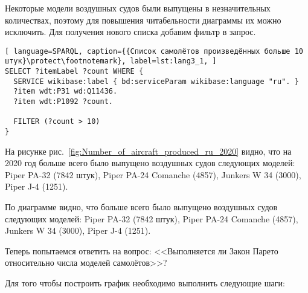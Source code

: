 Некоторые модели воздушных судов были выпущены в незначительных количествах, поэтому для повышения читабельности диаграммы их можно исключить. Для получения нового списка добавим фильтр в запрос.

\begin{lstlisting}[ language=SPARQL, caption={{Список самолётов произведённых больше 10 штук}\protect\footnotemark}, label=lst:lang3_1, ]
SELECT ?itemLabel ?count WHERE {
  SERVICE wikibase:label { bd:serviceParam wikibase:language "ru". }
  ?item wdt:P31 wd:Q11436.
  ?item wdt:P1092 ?count.
  
  FILTER (?count > 10)
}
\end{lstlisting}


На рисунке рис.~\ref{fig:Number_of_aircraft_produced_ru_2020} видно, что на 2020 год больше всего было выпущено воздушных судов следующих моделей: Piper PA-32 (\num{7842} штук), Piper PA-24 Comanche (\num{4857}), Junkers W 34 (\num{3000}), Piper J-4 (\num{1251}).

\begin{figure*}[h]

    \setlength{\fboxsep}{0pt}%
    \setlength{\fboxrule}{1pt}%

	\caption{Количество выпущенных воздушных судов по моделям, 2020.}%
    \label{fig:Number_of_aircraft_produced_ru_2020}%
\end{figure*}

По диаграмме видно, что больше всего было выпущено воздушных судов следующих моделей: Piper PA-32 (\num{7842} штук), Piper PA-24 Comanche (\num{4857}), Junkers W 34 (\num{3000}), Piper J-4 (\num{1251}).

Теперь попытаемся ответить на вопрос: <<Выполняется ли Закон Парето относительно числа моделей самолётов>>?

Для того чтобы построить график необходимо выполнить следующие шаги:

